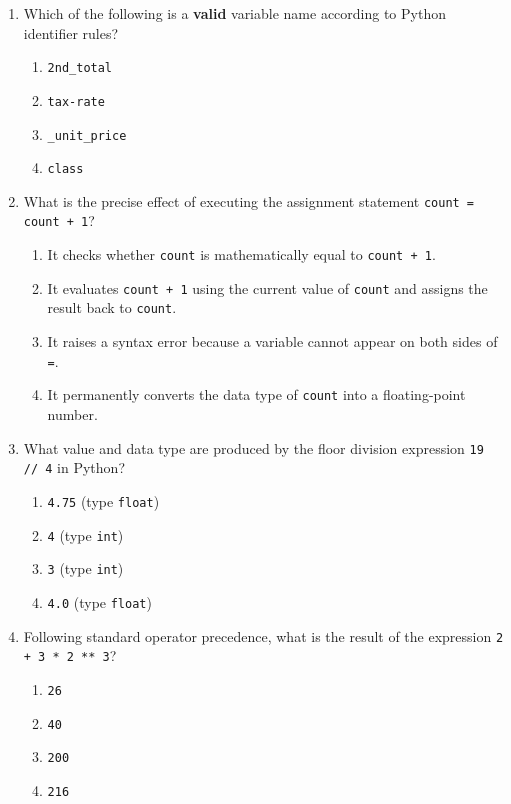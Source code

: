 \documentclass[11pt,a4paper]{article}
\begin{document}
\begin{enumerate}[label=\textbf{Q\arabic*.},leftmargin=2em,itemsep=2pt,topsep=1pt]

\item Which of the following is a \textbf{valid} variable name according to Python identifier rules?
\begin{enumerate}[label=\Alph*.,leftmargin=2em]
  \item \texttt{2nd\_total}
  \item \texttt{tax-rate}
  \item \texttt{\_unit\_price}
  \item \texttt{class}
\end{enumerate}

\item What is the precise effect of executing the assignment statement \texttt{count = count + 1}?
\begin{enumerate}[label=\Alph*.,leftmargin=2em]
  \item It checks whether \texttt{count} is mathematically equal to \texttt{count + 1}.
  \item It evaluates \texttt{count + 1} using the current value of \texttt{count} and assigns the result back to \texttt{count}.
  \item It raises a syntax error because a variable cannot appear on both sides of \texttt{=}.
  \item It permanently converts the data type of \texttt{count} into a floating-point number.
\end{enumerate}

\item What value and data type are produced by the floor division expression \texttt{19 // 4} in Python?
\begin{enumerate}[label=\Alph*.,leftmargin=2em]
  \item \texttt{4.75} (type \texttt{float})
  \item \texttt{4} (type \texttt{int})
  \item \texttt{3} (type \texttt{int})
  \item \texttt{4.0} (type \texttt{float})
\end{enumerate}

\item Following standard operator precedence, what is the result of the expression \texttt{2 + 3 * 2 ** 3}?
\begin{enumerate}[label=\Alph*.,leftmargin=2em]
  \item \texttt{26}
  \item \texttt{40}
  \item \texttt{200}
  \item \texttt{216}
\end{enumerate}


\end{enumerate}
\end{document}
